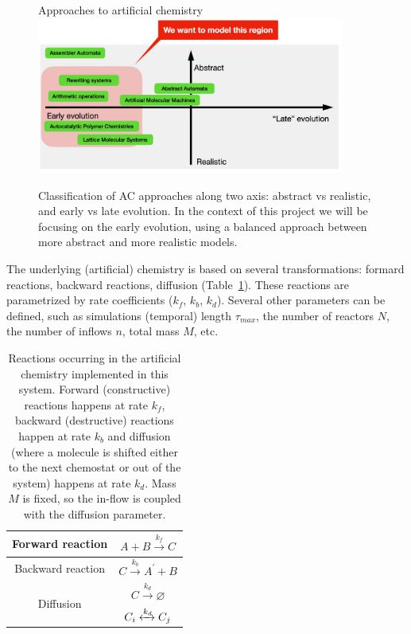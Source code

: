 \documentclass[11pt]{article}
\begin{document}
\begin{figure}[hbt]
  \centering
  {\LARGE Approaches to artificial chemistry}\vspace{1em}\\
  \includegraphics[width=0.90\textwidth]{figures/system/abstraction-stage.pdf}
  \caption{Classification of AC approaches along two axis: abstract vs realistic, and early vs late evolution. In the context of this project we will be focusing on the early evolution, using a balanced approach between more abstract and more realistic models.}
  \label{fig:abstraction-stage}
\end{figure}

The underlying (artificial) chemistry is based on several transformations: formard reactions, backward reactions, diffusion (Table~\ref{tab:reactions}). These reactions are parametrized by rate coefficients ($k_f$, $k_b$, $k_d$). Several other parameters can be defined, such as simulations (temporal) length $\tau_{max}$, the number of reactors $N$, the number of inflows $n$, total mass $M$, etc.\\

\begin{table}[h]
\centering
\begin{tabular}{|c|c|}
\hline Forward reaction & $A+B \xrightarrow{k_f} C$ \\
\hline Backward reaction & $C \xrightarrow{k_b} A^{\prime}+B$ \\
\hline \multirow{2}{*}{ Diffusion } & $C \xrightarrow{k_d} \varnothing$ \\
\cline { 2 - 2 } & $C_i \xleftrightarrow{k_d} C_j$ \\
\hline
\end{tabular}  
\caption{Reactions occurring in the artificial chemistry implemented in this system. Forward (constructive) reactions happens at rate $k_f$, backward (destructive) reactions happen at rate $k_b$ and diffusion (where a molecule is shifted either to the next chemostat or out of the system) happens at rate $k_d$. Mass $M$ is fixed, so the in-flow is coupled with the diffusion parameter.}
\label{tab:reactions}
\end{table}
\end{document}
